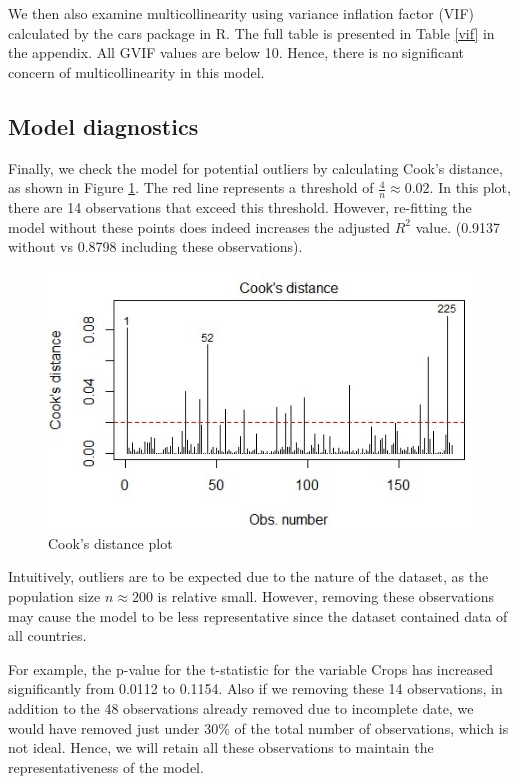 \documentclass[12pt,a4paper]{article}
\renewcommand\texttt[1]{{\ttfamily\color{ttcolor}#1}}
\begin{document}
We then also examine multicollinearity using variance inflation factor (VIF) calculated by the \texttt{cars} package in R. The full table is presented in Table \ref{vif} in the appendix. All GVIF values are below 10. Hence, there is no significant concern of multicollinearity in this model. 

\pagebreak
\subsection{Model diagnostics}
Finally, we check the model for potential outliers by calculating Cook's distance, as shown in Figure \ref{cooks}. The red line represents a threshold of $\frac{4}{n}\approx 0.02$. In this plot, there are 14 observations that exceed this threshold. However, re-fitting the model without these points does indeed increases the adjusted $R^2$ value. (0.9137 without vs 0.8798 including these observations).

\begin{figure}
\includegraphics[width=1\linewidth]{cooks2}
\vspace{-10pt}
\caption{Cook's distance plot}
\label{cooks}
\end{figure}

Intuitively, outliers are to be expected due to the nature of the dataset, as the population size $n \approx 200$ is relative small. However, removing these observations may cause the model to be less representative since the dataset contained data of all countries. 

For example, the p-value for the t-statistic for the variable \texttt{Crops} has increased significantly from 0.0112 to 0.1154. Also if we removing these 14 observations, in addition to the 48 observations already removed due to incomplete date, we would have removed just under 30\% of the total number of observations, which is not ideal. Hence, we will retain all these observations to maintain the representativeness of the model.
\end{document}

